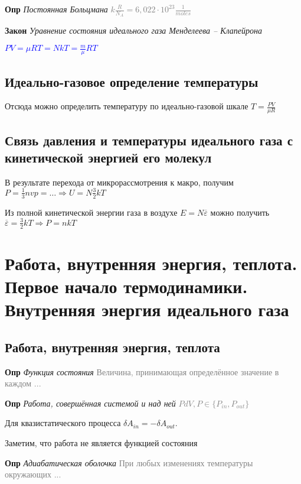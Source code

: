 \documentclass[a4paper, 14pt]{article}
\begin{document}
    \textbf{Опр} \textit{Постоянная Больцмана} \textcolor{gray}{$k \frac{R}{N_A} = 6,022 \cdot 10^{23} \frac{1}{moles}$}

    \textbf{Закон} \textit{Уравнение состояния идеального газа Менделеева -- Клапейрона}

    \textcolor{blue}{$PV = \mu RT = NkT = \frac{m}{\mu} RT$}

    \subsection{Идеально-газовое определение температуры}

    Отсюда можно определить температуру по идеально-газовой шкале $T = \frac{PV}{\mu R}$

    \subsection{Связь давления и температуры идеального газа с кинетической энергией его молекул}

    В результате перехода от микрорассмотрения к макро, получим $P = \frac{1}{3}nvp = \dots \Rightarrow U = N \frac{3
    }{2}kT$

    Из полной кинетической энергии газа в воздухе $E = N \overline{\varepsilon}$ можно получить $\overline{\varepsilon}
    = \frac{3}{2}kT \Rightarrow P = nkT$

    \section{Работа, внутренняя энергия, теплота.
    Первое начало термодинамики.
    Внутренняя энергия идеального газа}

    \subsection{Работа, внутренняя энергия, теплота}

    \textbf{Опр} \textit{Функция состояния} \textcolor{gray}{Величина, принимающая определённое значение в каждом ...}

    \textbf{Опр} \textit{Работа, совершённая системой и над ней} \textcolor{gray}{$PdV, P \in \{P_{in}, P_{out} \}$}

    Для квазистатического процесса $\delta A_{in} = - \delta A_{out}$.

    Заметим, что работа не является функцией состояния

    \textbf{Опр} \textit{Адиабатическая оболочка} \textcolor{gray}{При любых изменениях температуры окружающих ...}
\end{document}
